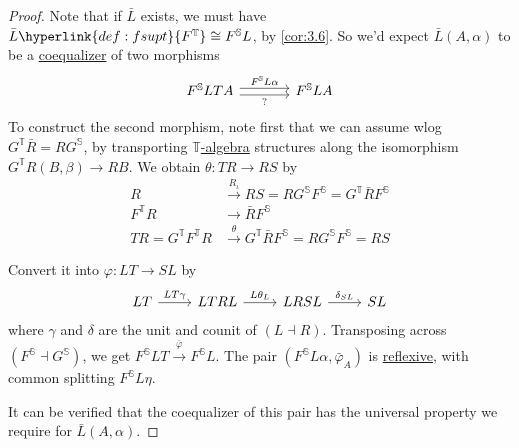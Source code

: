 \documentclass{article}
\begin{document}
\begin{proof}
  Note that if $\bar{L}$ exists, we must have $\bar{L} \hyperlink{def:fsupt}{F^\mathbb{T}} \cong F^\mathbb{S} L$, by \cref{cor:3.6}.
  So we'd expect $\bar{L}(A,\alpha)$ to be a \hyperlink{def:equalizer}{coequalizer} of two morphisms
  \begin{equation*}
    \begin{tikzcd}[column sep=large]
      F^\mathbb{S} L T A \rar[shift left]{F^\mathbb{S} L \alpha} \rar[shift right,']{?} & F^\mathbb{S} L A
    \end{tikzcd}
  \end{equation*}
  To construct the second morphism, note first that we can assume wlog $G^\mathbb{T} \bar{R} = R G^\mathbb{S}$, by transporting \hyperlink{def:em}{$\mathbb{T}$-algebra} structures along the isomorphism $G^\mathbb{T} R(B, \beta) \to RB$.
  We obtain $\theta: TR \to RS$ by
  \begin{align*}
    R &\xrightarrow{R_\iota} RS = RG^\mathbb{S} F^\mathbb{S} = G^\mathbb{T} \bar{R} F^\mathbb{S} \\
    F^\mathbb{T} R &\to \bar{R} F^\mathbb{S} \\
    TR = G^\mathbb{T} F^\mathbb{T} R &\xrightarrow{\theta} G^\mathbb{T} \bar{R} F^\mathbb{S} = R G^\mathbb{S} F^\mathbb{S} = RS
  \end{align*}

  Convert it into $\varphi: LT \to SL$ by
  \begin{equation*}
    \begin{tikzcd}
      LT \rar{LT\gamma} & LTRL \rar{L\theta_L} & LRSL \rar{\delta_{SL}} & SL
    \end{tikzcd}
  \end{equation*}
  where $\gamma$ and $\delta$ are the unit and counit of $(L \dashv R)$.
  Transposing across $(F^\mathbb{S} \dashv G^\mathbb{S})$, we get $F^\mathbb{S} LT \xrightarrow{\bar{\varphi}} F^\mathbb{S} L$.
  The pair $(F^\mathbb{S} L \alpha, \bar{\varphi}_A)$ is \hyperlink{def:reflexive}{reflexive}, with common splitting $F^\mathbb{S} L \eta$.

  It can be verified that the coequalizer of this pair has the universal property we require for $\bar{L}(A,\alpha)$.
\end{proof}

\clearpage
\end{document}
